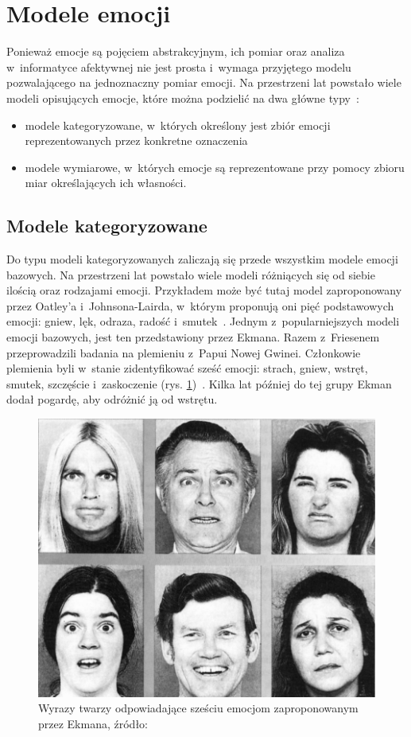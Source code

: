 \section{Modele emocji}
Ponieważ emocje są pojęciem abstrakcyjnym, ich pomiar oraz analiza w~informatyce afektywnej nie jest prosta i~wymaga przyjętego modelu pozwalającego na jednoznaczny pomiar emocji. Na przestrzeni lat powstało wiele modeli opisujących emocje, które można podzielić na dwa główne typy~\cite{emotion_models_review_2017}:
\begin{itemize}
	\item modele kategoryzowane, w~których określony jest zbiór emocji reprezentowanych przez konkretne oznaczenia
	\item modele wymiarowe, w~których emocje są reprezentowane przy pomocy zbioru miar określających ich własności.
\end{itemize}

\subsection{Modele kategoryzowane}
Do typu modeli kategoryzowanych zaliczają się przede wszystkim modele emocji bazowych. Na przestrzeni lat powstało wiele modeli różniących się od siebie ilością oraz rodzajami emocji. Przykładem może być tutaj model zaproponowany przez Oatley'a i~Johnsona-Lairda, w~którym proponują oni pięć podstawowych emocji: gniew, lęk, odraza, radość i~smutek~\cite{oatley_theory_of_emotions}. Jednym z~popularniejszych modeli emocji bazowych, jest ten przedstawiony przez Ekmana. Razem z~Friesenem przeprowadzili badania na plemieniu z~Papui Nowej Gwinei. Członkowie plemienia byli w~stanie zidentyfikować sześć emocji: strach, gniew, wstręt, smutek, szczęście i~zaskoczenie (rys. \ref{fig:ekman_six_emotions})~\cite{Ekman1971ConstantsAC}. Kilka lat później do tej grupy Ekman dodał pogardę, aby odróżnić ją od wstrętu. 
\begin{figure}[h]
	\centering
	\includegraphics[width=0.6\linewidth]{images/ekman_six_basic_emotions.png}
	\caption{Wyrazy twarzy odpowiadające sześciu emocjom zaproponowanym przez Ekmana, źródło: \cite{Ekman1971ConstantsAC}}
	\label{fig:ekman_six_emotions}
\end{figure}

